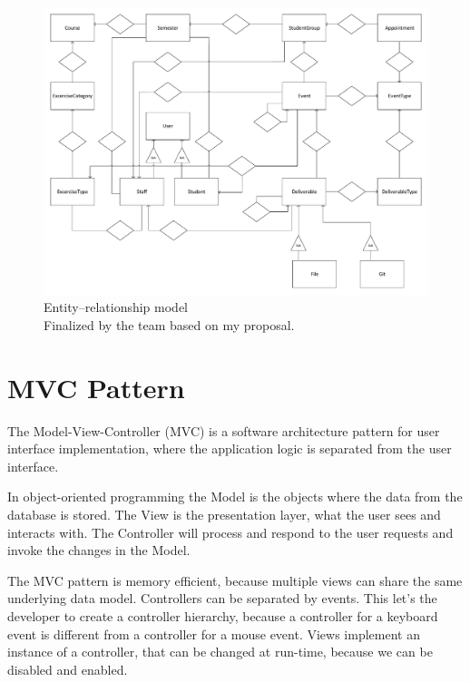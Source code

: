 \begin{figure}[!htbp]
	\includegraphics[width=0.85\textheight, angle=90]{figures/ER.pdf}
	\caption[Entity–relationship model]{Entity–relationship model\\Finalized by the team based on my proposal.}
	\label{fig:er}
\end{figure}


\newpage
\section{MVC Pattern}
\label{mvc}

The Model-View-Controller (MVC) is a software architecture pattern for user interface implementation, where the application logic is separated from the user interface.

In object-oriented programming the Model is the objects where the data from the database is stored. The View is the presentation layer, what the user sees and interacts with. The Controller will process and respond to the user requests and invoke the changes in the Model. 

The MVC pattern is memory efficient, because multiple views can share the same underlying data model. Controllers can be separated by events. This let's the developer to create a controller hierarchy, because a controller for a keyboard event is different from a controller for a mouse event. Views implement an instance of a controller, that can be changed at run-time, because we can be disabled and enabled.


